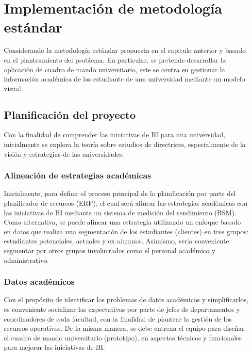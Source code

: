 \documentclass[11pt,titlepage]{report}
\begin{document}

\section{Implementación de metodología estándar}

Considerando la metodología estándar propuesta en el capitulo anterior y basado en el planteamiento del problema. En particular, se pretende desarrollar la aplicación de cuadro de mando universitario, este se centra en gestionar la información académica de los estudiante de una universidad mediante un modelo visual.

\subsection{Planificación del proyecto}
Con la finalidad de comprender las iniciativas de BI para una universidad, inicialmente se explora la teoría sobre estudios de directrices, especialmente de la visión y estrategias de las universidades. 

\subsubsection{Alineación de estrategias académicas}
Inicialmente, para definir el proceso principal de la planificación por parte del planificador de recursos (ERP), el cual será alinear las estrategias académicas con las iniciativas de BI mediante un sistema de medición del rendimiento (BSM). Como alternativa, se puede alinear una estrategia utilizando un enfoque basado en datos que realiza una segmentación de los estudiantes (clientes) en tres grupos: estudiantes potenciales, actuales y ex alumnos. Asimismo, seria conveniente segmentar por otros grupos involucrados como el personal académico y administrativo.\\


\subsubsection{Datos académicos}
Con el propósito de identificar los problemas de datos académicos y simplificarlos, es conveniente socializar las expectativas por parte de jefes de departamentos y coordinadores de cada facultad, con la finalidad de plantear la gestión de los recursos operativos. De la misma manera, se debe entrena el equipo para diseñar el cuadro de mando universitario (prototipo), en aspectos técnicos y funcionales para mejorar las iniciativas de BI.
\end{document}
